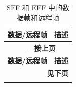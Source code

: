 \begin{longtable}[c]{|p{3.5cm}|p{12cm}|} 
    
  \caption{SFF 和 EFF 中的数据帧和远程帧}
  \label{tab:twai-data-frames-and-remote-frames} 
  \\\hline
  \rowcolor{lightgray}
  \textbf{数据/远程帧} & \textbf{描述}
  \\\hline
  \endfirsthead
  
  \multicolumn{2}{c}{\bfseries \tablename\ \thetable{} -- 接上页}\\  \hline
  
  \rowcolor{lightgray}
    \textbf{数据/远程帧} & \textbf{描述}
  \\\hline
  \endhead
  
  \multicolumn{2}{r}{\textbf{见下页}} \\
  \endfoot
  \endlastfoot
  

\end{longtable}
